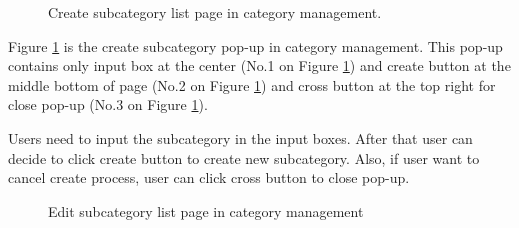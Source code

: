 \documentclass[12pt,oneside,openright,a4paper]{cpe-english-project}
\begin{document}
		\begin{figure}[!h]\centering
			\caption{Create subcategory list page in category management.}\label{fig:Create_subcategory_list_page_in_category_management_done}
		\end{figure}
		\begin{flushleft}
			Figure \ref*{fig:Create_subcategory_list_page_in_category_management_done} is the create subcategory pop-up in category management. This pop-up contains only input box at the center (No.1 on Figure \ref*{fig:Create_subcategory_list_page_in_category_management_done}) and create button at the middle bottom of page (No.2 on Figure \ref*{fig:Create_subcategory_list_page_in_category_management_done}) and cross button at the top right for close pop-up (No.3 on Figure \ref*{fig:Create_subcategory_list_page_in_category_management_done}).
		\end{flushleft}
		\begin{flushleft}
			Users need to input the subcategory in the input boxes. After that user can decide to click create button to create new subcategory. Also, if user want to cancel create process, user can click cross button to close pop-up.
		\end{flushleft}
\pagebreak
		\begin{figure}[!h]\centering
			\caption{Edit subcategory list page in category management}\label{fig:Edit_subcategory_list_page_in_category_management_done}
		\end{figure}
\end{document}
